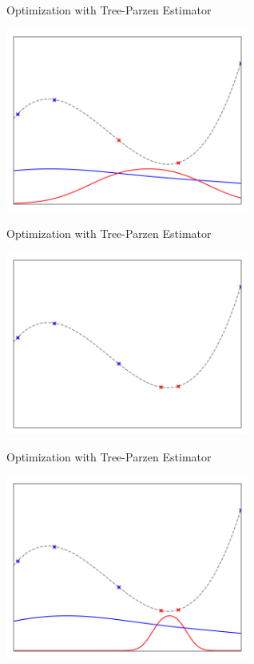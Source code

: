 \begin{frame}[c]{Optimization with Tree-Parzen Estimator}

\centering
\includegraphics[width=0.6\textwidth]{images/tpe/tpeiter_1_pdfs.png}


\end{frame}
\begin{frame}[c]{Optimization with Tree-Parzen Estimator}

\centering
\includegraphics[width=0.6\textwidth]{images/tpe/tpeiter_2_observations.png}


\end{frame}
\begin{frame}[c]{Optimization with Tree-Parzen Estimator}

\centering
\includegraphics[width=0.6\textwidth]{images/tpe/tpeiter_2_pdfs.png}


\end{frame}
